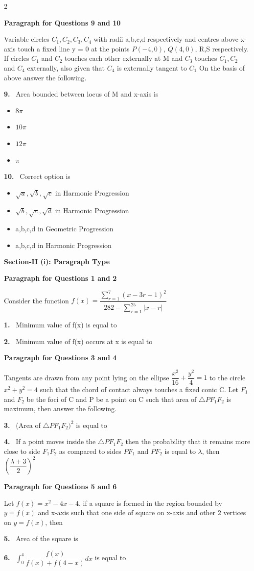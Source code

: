 \documentclass[10pt]{extarticle}
\newcommand{\sect}[1]{\par\smallskip\noindent\textbf{#1}\par}
\newcommand{\qn}[1]{\par\smallskip\noindent\textbf{#1.}~}
\newcommand{\paraq}[2]{\par\smallskip\noindent\textbf{Paragraph for Questions #1 and #2}\par}
\newenvironment{qoptions}{\begin{itemize}[leftmargin=1.8em,itemsep=1pt,topsep=2pt,label={}]}{\end{itemize}}
\newcommand{\opt}[2]{\item[(#1)] #2}
\begin{document}
\begin{multicols}{2}
\paraq{9}{10}
Variable circles $C_1,C_2,C_3,C_4$ with radii a,b,c,d respectively and centres above x-axis touch a fixed line y = 0 at the points $P(-4,0)$, $Q(4,0)$, R,S respectively. If circles $C_1$ and $C_2$ touches each other externally at M and $C_3$ touches $C_1,C_2$ and $C_4$ externally, also given that $C_4$ is externally tangent to $C_1$ On the basis of above answer the following.

\qn{9} Area bounded between locus of M and x-axis is
\begin{qoptions}
\opt{A}{$8\pi$}
\opt{B}{$10\pi$}
\opt{C}{$12\pi$}
\opt{D}{$\pi$}
\end{qoptions}

\qn{10} Correct option is
\begin{qoptions}
\opt{A}{$\sqrt a,\sqrt b,\sqrt c$ in Harmonic Progression}
\opt{B}{$\sqrt b,\sqrt c,\sqrt d$ in Harmonic Progression}
\opt{C}{a,b,c,d in Geometric Progression}
\opt{D}{a,b,c,d in Harmonic Progression}
\end{qoptions}

\sect{Section-II (i): Paragraph Type}

\paraq{1}{2}
Consider the function $f(x)=\dfrac{\displaystyle\sum_{r=1}^7(x-3r-1)^2}{282-\displaystyle\sum_{r=1}^{25}|x-r|}$

\qn{1} Minimum value of f(x) is equal to

\qn{2} Minimum value of f(x) occurs at x is equal to

\paraq{3}{4}
Tangents are drawn from any point lying on the ellipse $\dfrac{x^2}{16}+\dfrac{y^2}{4}=1$ to the circle $x^2+y^2=4$ such that the chord of contact always touches a fixed conic C. Let $F_1$ and $F_2$ be the foci of C and P be a point on C such that area of $\triangle PF_1F_2$ is maximum, then answer the following.

\qn{3} (Area of $\triangle PF_1F_2)^2$ is equal to

\qn{4} If a point moves inside the $\triangle PF_1F_2$ then the probability that it remains more close to side $F_1F_2$ as compared to sides $PF_1$ and $PF_2$ is equal to $\lambda$, then $\left(\dfrac{\lambda+3}{2}\right)^2$

\paraq{5}{6}
Let $f(x)=x^2-4x-4$, if a square is formed in the region bounded by $y=f(x)$ and x-axis such that one side of square on x-axis and other 2 vertices on $y=f(x)$, then

\qn{5} Area of the square is

\qn{6} $\displaystyle\int_0^4\dfrac{f(x)}{f(x)+f(4-x)}dx$ is equal to


\end{multicols}
\end{document}
